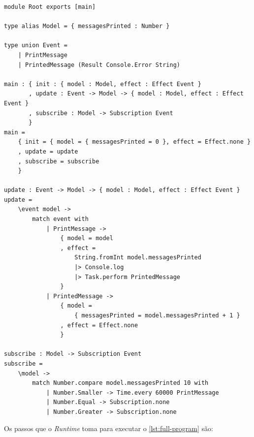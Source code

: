 \begin{lstlisting}[label={lst:full-program},caption={Exemplo de programa completo em Ipe, que imprime na tela uma mensagem a cada minuto}]
module Root exports [main]

type alias Model = { messagesPrinted : Number }

type union Event = 
    | PrintMessage
    | PrintedMessage (Result Console.Error String)

main : { init : { model : Model, effect : Effect Event }
       , update : Event -> Model -> { model : Model, effect : Effect Event }
       , subscribe : Model -> Subscription Event
       }
main =
    { init = { model = { messagesPrinted = 0 }, effect = Effect.none }
    , update = update
    , subscribe = subscribe
    }

update : Event -> Model -> { model : Model, effect : Effect Event }
update =
    \event model ->
        match event with
            | PrintMessage ->
                { model = model
                , effect = 
                    String.fromInt model.messagesPrinted
                    |> Console.log
                    |> Task.perform PrintedMessage
                }
            | PrintedMessage ->
                { model =
                    { messagesPrinted = model.messagesPrinted + 1 }
                , effect = Effect.none
                }

subscribe : Model -> Subscription Event
subscribe =
    \model ->
        match Number.compare model.messagesPrinted 10 with
            | Number.Smaller -> Time.every 60000 PrintMessage
            | Number.Equal -> Subscription.none
            | Number.Greater -> Subscription.none
\end{lstlisting}

Os passos que o \textit{Runtime} toma para executar o \autoref{lst:full-program}
são:


